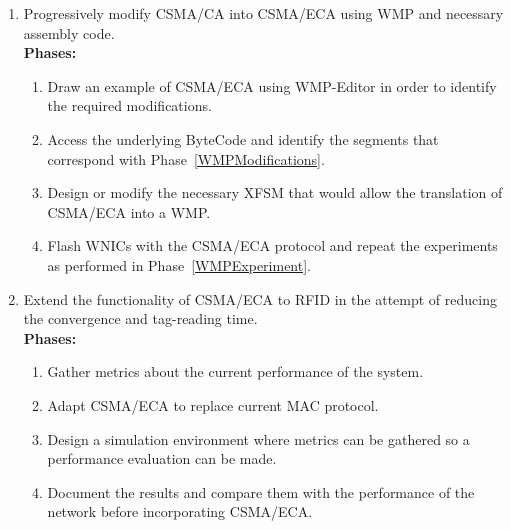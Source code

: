 \begin{enumerate}
	\item Progressively modify CSMA/CA into CSMA/ECA using WMP and necessary assembly code.\label{ECAinWMP}\\
	
	{\bfseries Phases:}
	\begin{enumerate}
		\item Draw an example of CSMA/ECA using WMP-Editor in order to identify the required modifications.\label{WMPModifications}
		\item Access the underlying ByteCode and identify the segments that correspond with Phase~\ref{WMPModifications}\label{accessByteCode}.
		\item Design or modify the necessary XFSM that would allow the translation of CSMA/ECA into a WMP.
		\item Flash WNICs with the CSMA/ECA protocol and repeat the experiments as performed in Phase~\ref{WMPExperiment}.\\
	\end{enumerate}

	\item Extend the functionality of CSMA/ECA to RFID in the attempt of reducing the convergence and tag-reading time.\label{ECAinRFID}\\
	
	{\bfseries Phases:}
	\begin{enumerate}
		\item Gather metrics about the current performance of the system.
		\item Adapt CSMA/ECA to replace current MAC protocol.
		\item Design a simulation environment where metrics can be gathered so a performance evaluation can be made. 
		\item Document the results and compare them with the performance of the network before incorporating CSMA/ECA.\\
	\end{enumerate}

\end{enumerate}
